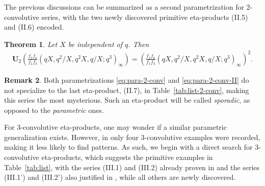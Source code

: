 \documentclass[12pt,reqno]{amsart}
\numberwithin{equation}{section}
\theoremstyle{plain}
\newtheorem{theorem}{Theorem}[section]
\theoremstyle{definition}
\newtheorem{remark}[theorem]{Remark}
\theoremstyle{named}
\newcommand{\UU}{\mathbf{U}}
\begin{document}
The previous discussions can be summarized as a second parametrization for $2$-convolutive series, with the two newly discovered primitive eta-products (II.5) and (II.6) encoded.

\begin{theorem}\label{th:para-2-conv-II}
	Let $X$ be independent of $q$. Then
	\begin{align}\label{eq:para-2-conv-II}
		\UU_2\left(\frac{f_2 f_6}{f_1 f_3} (qX,q^2/X,q^2X,q/X;q^3)_\infty\right) = \left(\frac{f_2 f_6}{f_1 f_3} (qX,q^2/X,q^2X,q/X;q^3)_\infty\right)^2.
	\end{align}
\end{theorem}

\begin{remark}
    Both parametrizations \eqref{eq:para-2-conv} and \eqref{eq:para-2-conv-II} do not specialize to the last eta-product, (II.7), in Table~\ref{tab:list-2-conv}, making this series the most mysterious. Such an eta-product will be called \emph{sporadic}, as opposed to the \emph{parametric} ones.
\end{remark}

For $3$-convolutive eta-products, one may wonder if a similar parametric generalization exists. However, in \cite{CEFS1} only four $3$-convolutive examples were recorded, making it less likely to find patterns. As such, we begin with a direct search for $3$-convolutive eta-products, which suggests the primitive examples in Table~\ref{tab:list}, with the series (III.1) and (III.2) already proven in \cite[Theorems~4.3 and 4.4]{CEFS1} and the series (III.1') and (III.2') also justified in \cite[Remark~4.1]{CEFS1}, while all others are newly discovered.
\end{document}
